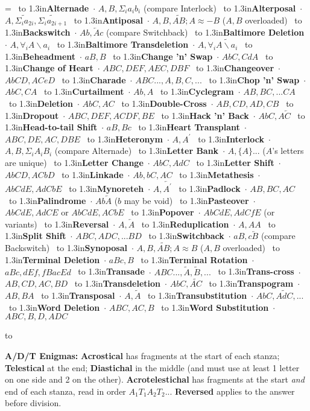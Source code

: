\def\x#1{\ \hbox to 1.3in{\hss \bf #1}\ $\cdot$}

\voffset -0.5in
\vsize 10in
\hoffset -0.5in
\hsize 7.5in
\parindent 0pt
\nopagenumbers
\frenchspacing

=\vbox{\obeylines\parskip=4pt\hsize
  \x{Alternade} $A, B, \Sigma_ia_ib_i$ (compare Interlock)
  \x{Alterposal} $A, \widetilde{\Sigma_ia_{2i}}, \widetilde{\Sigma_ia_{2i+1}}$
  \x{Antiposal} $A, B, \widetilde{AB}; A\approx -B$ ($A,B$ overloaded)
  \x{Backswitch} $Ab, \overleftarrow A c$ (compare Switchback)
  \x{Baltimore Deletion} $A, \forall_i{A\backslash a_i}$
  \x{Baltimore Transdeletion} $A, \forall_i\widetilde{A\backslash a_i}$
  \x{Beheadment} $aB, B$
  \x{Change 'n' Swap} $AbC, CdA$
  \x{Change of Heart} $ABC, DEF, AEC, DBF$
  \x{Changeover} $AbCD, ACeD$
  \x{Charade} $ABC..., A, B, C, ...$
  \x{Chop 'n' Swap} $AbC, CA$
  \x{Curtailment} $Ab, A$
  \x{Cyclegram} $AB, BC, ... CA$
  \x{Deletion} $AbC, AC$
  \x{Double-Cross} $AB, CD, AD, CB$
  \x{Dropout} $ABC, DEF, ACDF, BE$
  \x{Hack 'n' Back} $AbC, A\overleftarrow C$
  \x{Head-to-tail Shift} $aB, Bc$
  \x{Heart Transplant} $ABC, DE, AC, DBE$
  \x{Heteronym} $A, A^\prime$
  \x{Interlock} $A, B, \Sigma_iA_iB_i$ (compare Alternade)
  \x{Letter Bank} $A, \{A\}...$ ($A$'s letters are unique)
  \x{Letter Change} $AbC, AdC$
  \x{Letter Shift} $AbCD, ACbD$
  \x{Linkade} $Ab, bC, AC$
  \x{Metathesis} $AbCdE, AdCbE$
  \x{Mynoreteh} $A, \overleftarrow{A^\prime}$
  \x{Padlock} $AB, BC, AC$
  \x{Palindrome} $Ab\overleftarrow A$ ($b$ may be void)
  \x{Pasteover} $AbCdE, AdCE$ or $AbCdE, ACbE$
  \x{Popover} $AbCdE, AdCfE$ (or variants)
  \x{Reversal} $A, \overleftarrow A$
  \x{Reduplication} $A, AA$
  \x{Split Shift} $ABC, ADC, ... BD$
  \x{Switchback} $aB, c\overleftarrow B$ (compare Backswitch)
  \x{Synoposal} $A, B, \widetilde{AB}; A\approx B$ ($A,B$ overloaded)
  \x{Terminal Deletion} $aBc, B$
  \x{Terminal Rotation} $aBc, dEf, fBa cEd$
  \x{Transade} $ABC..., \tilde A, \tilde B, ...$
  \x{Trans-cross} $AB, CD, AC, BD$
  \x{Transdeletion} $AbC, \widetilde{AC}$
  \x{Transpogram} $AB, BA$
  \x{Transposal} $A, \tilde A$
  \x{Transubstitution} $ AbC, \widetilde{AdC}, ...$
  \x{Word Deletion} $ABC, AC, B$
  \x{Word Substitution} $ABC, B, D, ADC$
}

\hbox to 
\parskip=4pt

{\bf A/D/T Enigmas:} {\bf Acrostical} has fragments at the start of each
stanza; {\bf Telestical} at the end; {\bf Diastichal} in the middle
(and must use at least 1 letter on one side and 2 on the other). {\bf
  Acrotelestichal} has fragments at the start {\it and} end of each
stanza, read in order $A_1T_1A_2T_2...$ {\bf Reversed} applies to the
answer before division.

